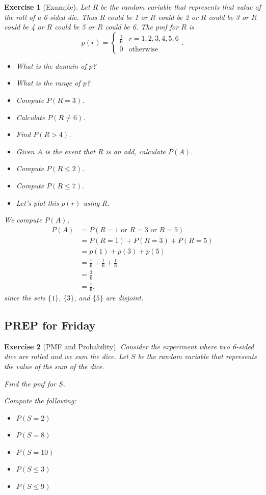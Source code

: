 \documentclass{article}
\theoremstyle{plain}
\theoremstyle{box}
\newtheorem*{exercise*}{Exercise}
\begin{document}
\begin{exercise*}[Example]
Let $R$ be the random variable that represents that value of the roll of a 6-sided die. Thus $R$ could be 1 or $R$ could be 2 or $R$ could be 3 or $R$ could be 4 or $R$ could be 5 or $R$ could be 6. The pmf for $R$ is 
      $$p(r) = 
    \begin{cases}
    \frac{1}{6} & r=1,2,3,4,5,6 \\
    0 & \text{otherwise}
    \end{cases}.$$

\noindent 

\begin{itemize}
\item What is the domain of $p$?
\item What is the range of $p$?
\item Compute $P(R = 3)$.
\item Calculate $P(R \neq 6)$.
\item Find $P(R > 4)$.
\item Given $A$ is the event that $R$ is an odd, calculate $P(A)$.
\item Compute $P(R \leq 2)$.
\item Compute $P(R \leq 7)$.
\item Let's plot this $p(r)$ using R.
\end{itemize}

We compute $P(A)$,
\begin{align*}
P(A) &= P(R=1 \text{ or } R=3 \text{ or } R=5)\\
&= P(R=1) + P(R=3) + P(R=5) \\
&= p(1) + p(3) + p(5) \\
&= \frac{1}{6} + \frac{1}{6} + \frac{1}{6} \\
&= \frac{3}{6} \\
&= \frac{1}{6},
\end{align*} 
since the sets $\{1\}$, $\{3\}$, and $\{5\}$ are disjoint. 
\end{exercise*}


\newpage
\subsection{PREP for Friday}
\begin{exercise*}[PMF and Probability]
Consider the experiment where two 6-sided dice are rolled and we sum the dice. Let $S$ be the random variable that represents the value of the sum of the dice.
\item Find the pmf for $S$.
\item Compute the following:
\begin{itemize}
\item $P(S = 2)$
\item $P(S = 8)$
\item $P(S = 10)$
\item $P(S \leq 3)$
\item $P(S \leq 9)$
\end{itemize}
\end{exercise*}



 
\end{document}
